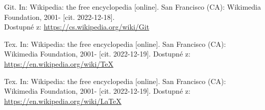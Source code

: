 \documentclass[main.tex]{subfiles}
\begin{document}
\renewcommand{\refname}{Seznam použité literatury a~zdrojů informací} 

\begin{thebibliography}{99}

 Git. In: Wikipedia: the free encyclopedia [online]. San Francisco (CA): Wikimedia Foundation, 2001- [cit. 2022-12-18].\\ Dostupné z: \url{https://cs.wikipedia.org/wiki/Git}

 Tex. In: Wikipedia: the free encyclopedia [online]. San Francisco (CA): Wikimedia Foundation, 2001- [cit. 2022-12-19]. Dostupné z: \url{https://en.wikipedia.org/wiki/TeX}

 Tex. In: Wikipedia: the free encyclopedia [online]. San Francisco (CA): Wikimedia Foundation, 2001- [cit. 2022-12-19]. Dostupné z: \url{https://en.wikipedia.org/wiki/LaTeX}





\end{thebibliography}
\end{document}

